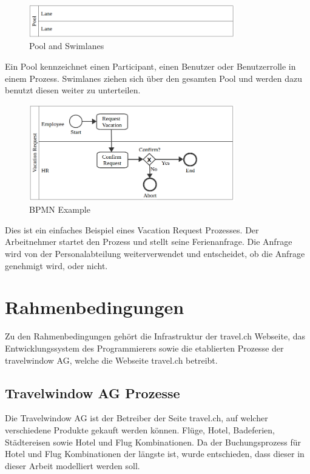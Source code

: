 \begin{figure}[H]
	\centering
	\includegraphics[width=0.8\textwidth]{images/bpmn-pool-swimlanes.png}
	\caption{Pool and Swimlanes}
	\label{fig:recherche:bpmn:poolswimlanes}
\end{figure}
Ein Pool kennzeichnet einen Participant, einen Benutzer oder Benutzerrolle in einem Prozess. Swimlanes ziehen sich über den gesamten Pool und werden dazu benutzt diesen weiter zu unterteilen.

\begin{figure}[H]
	\centering
	\includegraphics[width=0.8\textwidth]{images/bpmn-example.png}
	\caption{BPMN Example}
	\label{fig:recherche:bpmn:example}
\end{figure}
Dies ist ein einfaches Beispiel eines Vacation Request Prozesses. Der Arbeitnehmer startet den Prozess und stellt seine Ferienanfrage. Die Anfrage wird von der Personalabteilung weiterverwendet und entscheidet, ob die Anfrage genehmigt wird, oder nicht.

\section{Rahmenbedingungen}
Zu den Rahmenbedingungen gehört die Infrastruktur der travel.ch Webseite, das Entwicklungssystem des Programmierers sowie die etablierten Prozesse der travelwindow AG, welche die Webseite travel.ch betreibt.

\subsection{Travelwindow AG Prozesse}
\label{sec:Recherche:rahmenbedingungen:prozesse}
Die Travelwindow AG ist der Betreiber der Seite travel.ch, auf welcher verschiedene Produkte gekauft werden können. Flüge, Hotel, Badeferien, Städtereisen sowie Hotel und Flug Kombinationen. Da der Buchungsprozess für Hotel und Flug Kombinationen der längste ist, wurde entschieden, dass dieser in dieser Arbeit modelliert werden soll. 

